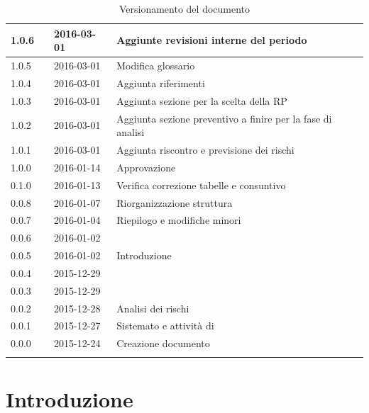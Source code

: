 \documentclass[12pt,a4paper]{article}
\begin{document}
\begin{center}
\begin{longtable}[H]{p{} p{} p{} p{}}
		\midrule
		1.0.6 & \AB{} & 2016-03-01 & Aggiunte revisioni interne del periodo \FP\ \\*
		\midrule
		1.0.5 & \AB{} & 2016-03-01 & Modifica glossario \\*
		\midrule
		1.0.4 & \AB{} & 2016-03-01 & Aggiunta riferimenti \\*
		\midrule
		1.0.3 & \AB{} & 2016-03-01 & Aggiunta sezione per la scelta della RP \\*
		\midrule
		1.0.2 & \AB{} & 2016-03-01 & Aggiunta sezione preventivo a finire per la fase di analisi \\*
		\midrule
		1.0.1 & \AB{} & 2016-03-01 & Aggiunta riscontro e previsione dei rischi \\*
		\midrule
		1.0.0 & \NDC{} & 2016-01-14 & Approvazione \\*
		\midrule
		0.1.0 & \AVE{} & 2016-01-13 & Verifica correzione tabelle e consuntivo  \FA{} \\*
		\midrule
		0.0.8 & \TP{} & 2016-01-07 & Riorganizzazione struttura \\*
		\midrule
		0.0.7 & \NDC{} & 2016-01-04 & Riepilogo e modifiche minori \\*
		\midrule
		0.0.6 & \WS{} & 2016-01-02 &  \FVV{} \\*
		\midrule
		0.0.5 & \WS{} & 2016-01-02 &  Introduzione \\*
		\midrule
		0.0.4 & \TP{} & 2015-12-29 &  \FPDC{} \\*
		\midrule
		0.0.3 & \TP{} & 2015-12-29 &  \FPA{} \\*
		\midrule
		0.0.2 & \NDC{} & 2015-12-28 &  Analisi dei rischi \\*
		\midrule
		0.0.1 & \NDC{} & 2015-12-27 &  Sistemato \mgls{template} e attività di \FA{} \\*
		\midrule
		0.0.0 & \NDC{} & 2015-12-24 &  Creazione documento \\*
		\bottomrule
		\caption{Versionamento del documento}
		\label{tabVers1}
	\end{longtable}
\end{center}

\newpage
\tableofcontents
\newpage
\listoftables
\listoffigures
\newpage

\section{Introduzione} 
\end{document}
